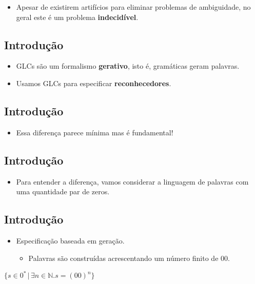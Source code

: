 \documentclass[11pt]{article}
\begin{document}
\begin{itemize}
\item Apesar de existirem artifícios para eliminar problemas de ambiguidade, no geral este é um problema \textbf{indecidível}.
\end{itemize}
\subsection*{Introdução}
\label{sec:org9721304}

\begin{itemize}
\item GLCs são um formalismo \textbf{gerativo}, isto é, gramáticas geram palavras.

\item Usamos GLCs para especificar \textbf{reconhecedores}.
\end{itemize}
\subsection*{Introdução}
\label{sec:org03fb404}

\begin{itemize}
\item Essa diferença parece mínima mas é fundamental!
\end{itemize}
\subsection*{Introdução}
\label{sec:org78e706f}

\begin{itemize}
\item Para entender a diferença, vamos considerar a linguagem de palavras com uma quantidade par de zeros.
\end{itemize}
\subsection*{Introdução}
\label{sec:orge85322b}

\begin{itemize}
\item Especificação baseada em geração.
\begin{itemize}
\item Palavras são construídas acrescentando um número finito de 00.
\end{itemize}
\end{itemize}

\(\{s \in 0^{*}\,|\, \exists n \in \mathbb{N}. s = (00)^n\}\)
\end{document}
